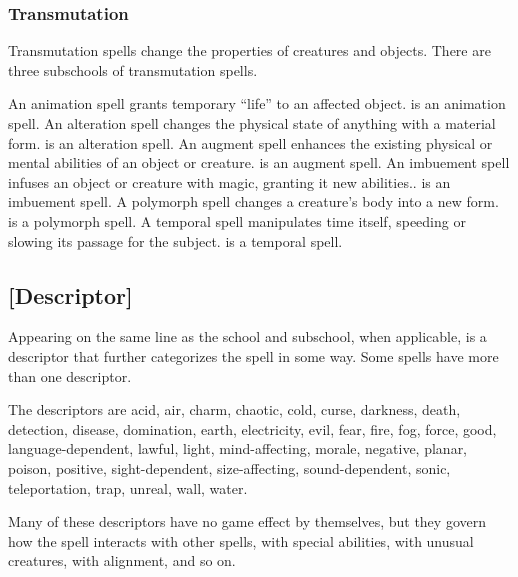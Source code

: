 \subsubsection{Transmutation}
Transmutation spells change the properties of creatures and objects. There are three subschools of transmutation spells.

 An animation spell grants temporary ``life'' to an affected object.  is an animation spell.
 An alteration spell changes the physical state of anything with a material form.  is an alteration spell.
 An augment spell enhances the existing physical or mental abilities of an object or creature.  is an augment spell.
 An imbuement spell infuses an object or creature with magic, granting it new abilities..  is an imbuement spell.
 A polymorph spell changes a creature's body into a new form.  is a polymorph spell.
 A temporal spell manipulates time itself, speeding or slowing its passage for the subject.  is a temporal spell.

\subsection{[Descriptor]}
Appearing on the same line as the school and subschool, when applicable, is a descriptor that further categorizes the spell in some way. Some spells have more than one descriptor.

The descriptors are acid, air, charm, chaotic, cold, curse, darkness, death, detection, disease, domination, earth, electricity, evil, fear, fire, fog, force, good, language-dependent, lawful, light, mind-affecting, morale, negative, planar, poison, positive, sight-dependent, size-affecting, sound-dependent, sonic, teleportation, trap, unreal, wall, water.

Many of these descriptors have no game effect by themselves, but they govern how the spell interacts with other spells, with special abilities, with unusual creatures, with alignment, and so on.

